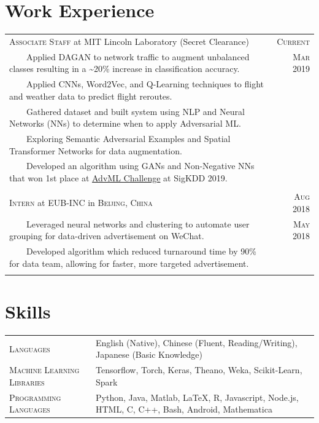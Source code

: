 \documentclass{article}
\newcommand{\tabitem}{~~\llap{\textbullet}~~}
\newcommand{\custombold}[1]{\color{subheadings}\fontspec[Path = fonts/lato/]{Lato-Reg}\selectfont #1 \normalfont}
\begin{document}
\section{Work Experience}
\begin{tabularx}{\textwidth}{X|r}

\large{\textsc{Associate Staff} at \custombold{MIT Lincoln Laboratory}} (Secret Clearance)& \textsc{Current}\\
\tabitem Applied DAGAN to network traffic to augment unbalanced classes resulting in a \textasciitilde 20\% increase in classification accuracy. & \textsc{Mar} 2019\\
\tabitem Applied CNNs, Word2Vec, and Q-Learning techniques to flight and weather data to predict flight reroutes. \\
\tabitem Gathered dataset and built system using NLP and Neural Networks (NNs) to determine when to apply Adversarial ML. \\
\tabitem Exploring Semantic Adversarial Examples and Spatial Transformer Networks for data augmentation. \\
\tabitem Developed an algorithm using GANs and Non-Negative NNs that won 1st place at \href{https://sites.google.com/view/advml/advml19-challenge}{AdvML Challenge} at SigKDD 2019.\\
\multicolumn{2}{c}{\vspace{-5pt}}\\



\large{\textsc{Intern} at \custombold{EUB-INC} in \textsc{Beijing, China}} & \textsc{Aug} 2018\\
\tabitem Leveraged neural networks and clustering to automate user grouping for data-driven advertisement on WeChat. & \textsc{May} 2018\\
\tabitem Developed algorithm which reduced turnaround time by 90\% for data team, allowing for faster, more targeted advertisement.\\
\multicolumn{2}{c}{\vspace{-5pt}} \\


\end{tabularx}

\vspace{12pt}\section{Skills}
\begin{tabularx}{\textwidth}{l|X}
\textsc{Languages} & English (Native), Chinese (Fluent, Reading/Writing), Japanese (Basic Knowledge) \\
\textsc{Machine Learning Libraries} & Tensorflow, Torch, Keras, Theano, Weka, Scikit-Learn, Spark \\
\textsc{Programming Languages} & Python, Java, Matlab, \LaTeX, R, Javascript, Node.js, HTML, C, C++, Bash, Android, Mathematica\\
\end{tabularx}
\end{document}
